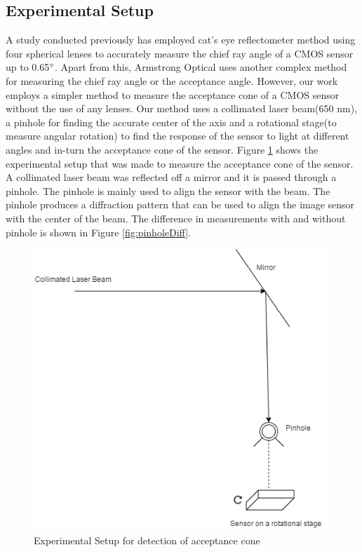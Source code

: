 \subsection{Experimental Setup}
A study conducted previously\cite{cra2} has employed cat's eye reflectometer method using four spherical lenses to accurately measure the chief ray angle of a CMOS sensor up to 0.65$\degree$\cite{cra2}. Apart from this, Armstrong Optical uses another complex method for measuring the chief ray angle or the acceptance angle\cite{cra1}. However, our work employs a simpler method to measure the acceptance cone of a CMOS sensor without the use of any lenses. Our method uses a collimated laser beam(650 nm), a pinhole for finding the accurate center of the axis and a rotational stage(to measure angular rotation) to find the response of the sensor to light at different angles and in-turn the acceptance cone of the sensor. 
Figure \ref{fig:exp_acc} shows the experimental setup that was made to measure the acceptance cone of the sensor. A collimated laser beam was reflected off a mirror and it is passed through a pinhole. The pinhole is mainly used to align the sensor with the beam. The pinhole produces a diffraction pattern that can be used to align the image sensor with the center of the beam. The difference in measurements with and without pinhole is shown in Figure \ref{fig:pinholeDiff}.
 \begin{figure}[ht]
\centering
\includegraphics[scale=0.50]{pics/acceptanceCone.png}
\caption{Experimental Setup for detection of acceptance cone}
\label{fig:exp_acc}
\end{figure}


